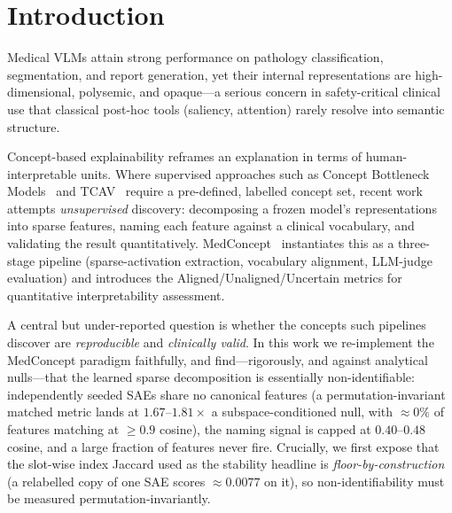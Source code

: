 \documentclass[sigconf, nonacm]{acmart}
\begin{document}

\maketitle

\section{Introduction}
Medical VLMs attain strong performance on pathology classification, segmentation, and report generation, yet their internal representations are high-dimensional, polysemic, and opaque---a serious concern in safety-critical clinical use that classical post-hoc tools (saliency, attention) rarely resolve into semantic structure.

Concept-based explainability reframes an explanation in terms of human-interpretable units. Where supervised approaches such as Concept Bottleneck Models~\cite{koh2020concept} and TCAV~\cite{kim2018tcav} require a pre-defined, labelled concept set, recent work attempts \emph{unsupervised} discovery: decomposing a frozen model's representations into sparse features, naming each feature against a clinical vocabulary, and validating the result quantitatively. MedConcept~\cite{haque2026medconcept} instantiates this as a three-stage pipeline (sparse-activation extraction, vocabulary alignment, LLM-judge evaluation) and introduces the Aligned/Unaligned/Uncertain metrics for quantitative interpretability assessment.

A central but under-reported question is whether the concepts such pipelines discover are \emph{reproducible} and \emph{clinically valid}. In this work we re-implement the MedConcept paradigm faithfully, and find---rigorously, and against analytical nulls---that the learned sparse decomposition is essentially non-identifiable: independently seeded SAEs share no canonical features (a permutation-invariant matched metric lands at $1.67$--$1.81{\times}$ a subspace-conditioned null, with ${\approx}0\%$ of features matching at $\geq0.9$ cosine), the naming signal is capped at $0.40$--$0.48$ cosine, and a large fraction of features never fire. Crucially, we first expose that the slot-wise index Jaccard used as the stability headline is \emph{floor-by-construction} (a relabelled copy of one SAE scores ${\approx}0.0077$ on it), so non-identifiability must be measured permutation-invariantly.
\end{document}
